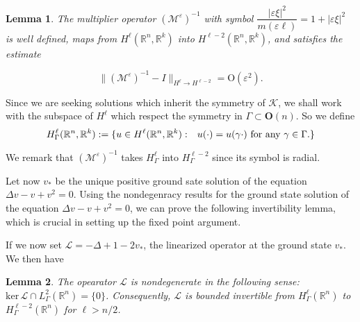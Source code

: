 \documentclass[10pt]{article}
\newtheorem{Lemma}{Lemma}[section]
\newcommand{\R}{\mathbb{R}}
\newcommand{\Ns}{\mathrm{ker\,}}
\newcommand{\rmO}{\mathrm{O}}
\newcommand{\eps}{\varepsilon}
\newcommand{\K}{\mathcal{K}}
\newcommand{\cL}{\mathcal{L}}
\newcommand{\M}{\mathcal{M}}
\begin{document}
\iffalse
recall we defined \[ 
\widehat{\mathcal{M}^\eps v}(\xi) = \frac{m(\eps\xi)}{|\eps\xi|^2}\widehat{v}(\xi)=\frac{1}{1+|\eps\xi|^2} \widehat{v}(\xi). 
\] 
Since $1/(1+|\eps \xi|^2)$ is a bounded function on $\R^n$, $\M^\eps$ maps $H^\ell(\R^n,\R^k)$ into itself. And we had
\fi


\begin{Lemma}\label{estmult}The multiplier operator $(\M^\eps)^{-1}$ with symbol $\dfrac{|\eps\xi|^2}{m(\eps\ell)}=1+|\eps\xi|^2 $ is well defined, maps from $H^\ell  (\R^n,\R^k)$ into $H^{\ell-2} (\R^n,\R^k)$, and satisfies the estimate

\begin{equation}\label{e:precond}
\|(\M^\eps)^{-1}-I\|_{H^\ell \to H^{\ell-2}} = \rmO(\eps^2).
\end{equation}
\end{Lemma}


Since we are seeking solutions which inherit the symmetry of $\K$, we shall work with the subspace of $H^\ell$ which respect the symmetry in $\Gamma \subset \mathbf{O}(n)$. So we define
\[
H^\ell_{\Gamma}(\R^n,\R^k):=\{  u \in H^{\ell}(\R^n,\R^k): \hspace{0.1in}  u(\cdot) = u (\gamma\cdot) \text{ for any } \gamma \in \Gamma.\}
\]


We remark that $(\M^\eps)^{-1}$ takes  $H^\ell_{\Gamma}$ into $H^{\ell-2}_{\Gamma}$ since its symbol is radial.


Let now $v_*$ be the unique positive ground sate solution of the equation $\Delta v - v +v^2 = 0$. Using the nondegenracy results for the ground state solution of the equation $\Delta v -v + v^2 =0$, we can prove the following invertibility lemma, which is crucial in setting up the fixed point argument.

If we now set $\cL = -\Delta+1-2v_*$, the linearized operator at the ground state $v_*$. We then have

\begin{Lemma}\label{nondeg}
The opearator $\cL$ is nondegenerate in the following sense: $\Ns \cL \cap L^2_{\Gamma}(\R^n) = \{0\}$. Consequently, $\cL$ is bounded invertible from  $H^{\ell}_{\Gamma}(\R^n)$ to $H^{\ell-2}_{\Gamma}(\R^n)$ for $\ell>n/2$.
\end{Lemma}
\end{document}
